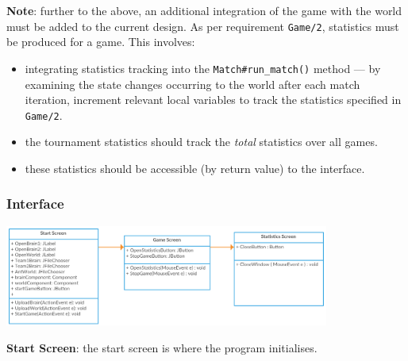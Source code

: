 \documentclass[11pt]{article}
\begin{document}
\textbf{Note}: further to the above, an additional integration of the game with the world must be added to the current design. As per requirement \texttt{Game/2}, statistics must be produced for a game. This involves:
\begin{itemize}
\item integrating statistics tracking into the \texttt{Match\#run\_match()} method --- by examining the state changes occurring to the world after each match iteration, increment relevant local variables to track the statistics specified in \texttt{Game/2}.
\item the tournament statistics should track the \textit{total} statistics over all games.
\item these statistics should be accessible (by return value) to the interface. 
\end{itemize}


\subsubsection{Interface}

\begin{center}
\includegraphics[width=0.8\textwidth]{low-level-diagrams/class/gui.png}
\end{center}

\textbf{Start Screen}: the start screen is where the program initialises.
\end{document}
